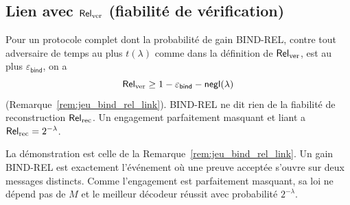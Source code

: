 \begin{sloppypar}
\subsection{Lien avec $\mathsf{Rel}_{\mathrm{ver}}$ (fiabilit\'e de v\'erification)}

\begin{remark}
\label{rem:ann_bind_rel_link}
Pour un protocole complet dont la probabilit\'e de gain BIND-REL, contre tout adversaire de temps
au plus $t(\lambda)$ comme dans la d\'efinition de $\mathsf{Rel}_{\mathrm{ver}}$, est au plus $\varepsilon_{\mathsf{bind}}$, on a
\begin{equation}
\mathsf{Rel}_{\mathrm{ver}} \geq 1 - \varepsilon_{\mathsf{bind}} - \mathsf{negl}(\lambda)
\end{equation}
(Remarque~\ref{rem:jeu_bind_rel_link}). BIND-REL ne dit rien de la fiabilit\'e de
reconstruction $\mathsf{Rel}_{\mathrm{rec}}$. Un engagement parfaitement masquant et liant a
$\mathsf{Rel}_{\mathrm{rec}} = 2^{-\lambda}$.
\end{remark}

\begin{Preuve}
La d\'emonstration est celle de la Remarque~\ref{rem:jeu_bind_rel_link}. Un gain
BIND-REL est exactement l'\'ev\'enement o\`u une preuve accept\'ee s'ouvre sur deux
messages distincts. Comme l'engagement est parfaitement masquant, sa loi ne d\'epend
pas de $M$ et le meilleur d\'ecodeur r\'eussit avec probabilit\'e $2^{-\lambda}$.
\end{Preuve}
\end{sloppypar}

